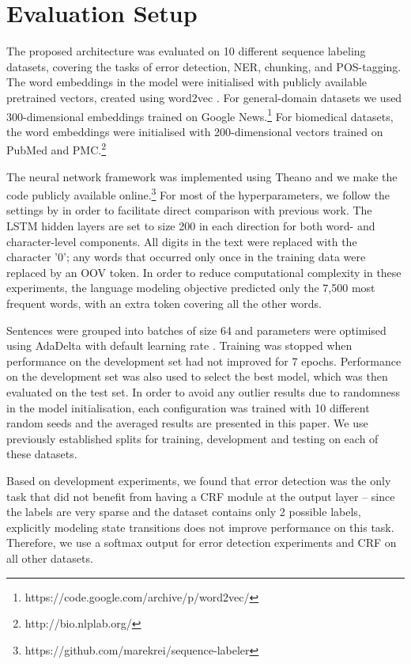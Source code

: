 \documentclass[11pt,a4paper]{article}
\begin{document}
\section{Evaluation Setup}

The proposed architecture was evaluated on 10 different sequence labeling datasets, covering the tasks of error detection, NER, chunking, and POS-tagging.
The word embeddings in the model were initialised with publicly available pretrained vectors, created using word2vec \cite{Mikolov2013a}. 
For general-domain datasets we used 300-dimensional embeddings trained on Google News.\footnote{https://code.google.com/archive/p/word2vec/}
For biomedical datasets, the word embeddings were initialised with 200-dimensional vectors trained on PubMed and PMC.\footnote{http://bio.nlplab.org/}

The neural network framework was implemented using Theano \cite{Al-Rfou2016} and we make the code publicly available online.\footnote{https://github.com/marekrei/sequence-labeler} For most of the hyperparameters, we follow the settings by  in order to facilitate direct comparison with previous work.
The LSTM hidden layers are set to size 200 in each direction for both word- and character-level components.
All digits in the text were replaced with the character ’0’; any words that occurred only once in the training data were replaced by an OOV token.
In order to reduce computational complexity in these experiments, the language modeling objective predicted only the 7,500 most frequent words, with an extra token covering all the other words.

Sentences were grouped into batches of size 64 and parameters were optimised using AdaDelta \cite{Zeiler2012} with default learning rate .
Training was stopped when performance on the development set had not improved for 7 epochs.
Performance on the development set was also used to select the best model, which was then evaluated on the test set.
In order to avoid any outlier results due to randomness in the model initialisation, each configuration was trained with 10 different random seeds and the averaged results are presented in this paper. We use previously established splits for training, development and testing on each of these datasets.


Based on development experiments, we found that error detection was the only task that did not benefit from having a CRF module at the output layer -- since the labels are very sparse and the dataset contains only 2 possible labels, explicitly modeling state transitions does not improve performance on this task. Therefore, we use a softmax output for error detection experiments and CRF on all other datasets.
\end{document}
